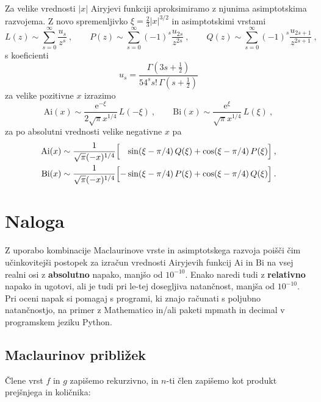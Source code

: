 \documentclass[slovene,11pt,a4paper]{article}
\newcommand{\Ai}{\mathrm{Ai}}
\newcommand{\Bi}{\mathrm{Bi}}
\begin{document}
Za velike vrednosti $|x|$ Airyjevi funkciji aproksimiramo
z njunima asimp\-tot\-ski\-ma razvojema.  Z novo spremenljivko
$\xi=\frac{2}{3} |x|^{3/2}$ in asimptotskimi vrstami
%
\begin{equation*}
  L(z) \sim \sum_{s=0}^\infty \frac{u_s}{z^s}\>,\qquad
  P(z) \sim \sum_{s=0}^\infty (-1)^s \frac{u_{2s}}{z^{2 s}}\>,\qquad
  Q(z) \sim \sum_{s=0}^\infty (-1)^s \frac{u_{2s+1}}{z^{2 s+1}}\>,
\end{equation*}
s koeficienti
\begin{equation*}
u_s = \frac{ \Gamma(3s + \frac{1}{2})}
        {54^s s!\, \Gamma(s + \frac{1}{2}) }
\end{equation*}
za velike pozitivne $x$ izrazimo
%
\begin{equation*}
\Ai(x)\sim  \frac{\mathrm{e}^{-\xi}}{2\sqrt{\pi} x^{1/4}} \, L(-\xi) \>, \qquad
\Bi(x)\sim  \frac{\mathrm{e}^{\xi}} { \sqrt{\pi} x^{1/4}} \, L(\xi)\>,
\end{equation*}
%
za po absolutni vrednosti velike negativne $x$ pa
%
%
\begin{align*}
    \Ai(x)&\sim  \frac{1}{\sqrt{\pi} (-x)^{1/4}}
    \Bigl[ \phantom{-}\sin(\xi-\pi/4) \, Q(\xi)
                    + \cos(\xi-\pi/4) \, P(\xi)\Bigr] \>, \\
    \Bi(x)&\sim  \frac{1}{\sqrt{\pi} (-x)^{1/4}}
    \Bigl[ - \sin(\xi-\pi/4) \, P(\xi)
      + \cos(\xi-\pi/4) \, Q(\xi)\Bigr]\>.
\end{align*}


\section{Naloga}

Z uporabo kombinacije Maclaurinove vrste in asimptotskega
razvoja poišči čim učinkovitejši postopek za izračun
vrednosti Airyjevih funkcij $\Ai$ in $\Bi$ na vsej real\-ni osi
z {\bf absolutno} napako, manjšo od $10^{-10}$. Enako naredi tudi z {\bf relativno} napako in ugotovi,
ali je tudi pri le-tej dosegljiva natančnost, manjša od $10^{-10}$.
Pri oceni napak si po\-ma\-gaj s programi, ki znajo računati s poljubno
natančnostjo, na primer z {\sc Mathematico} in/ali paketi {\sc mpmath} in {\sc decimal} v programskem
jeziku {\sc Python}.

\subsection{Maclaurinov približek}


Člene vrst $f$ in $g$ zapišemo rekurzivno, in $n$-ti člen zapišemo kot produkt prejšnjega in količnika:
\end{document}
